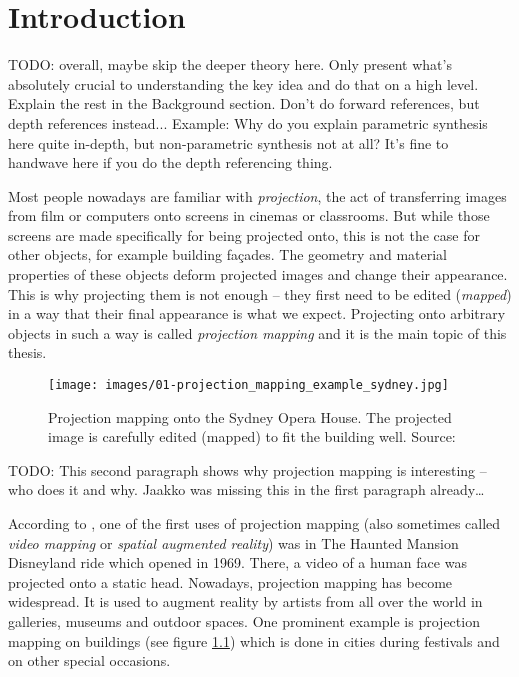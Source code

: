 \chapter{Introduction}
\label{chapter:intro}

{\color{red} TODO: overall, maybe skip the deeper theory here. Only present what's absolutely crucial to understanding the key idea and do that on a high level. Explain the rest in the Background section. Don't do forward references, but depth references instead... Example: Why do you explain parametric synthesis here quite in-depth, but non-parametric synthesis not at all? It's fine to handwave here if you do the depth referencing thing.}

Most people nowadays are familiar with \textit{projection}, the act of transferring images from film or computers onto screens in cinemas or classrooms. But while those screens are made specifically for being projected onto, this is not the case for other objects, for example building façades. The geometry and material properties of these objects deform projected images and change their appearance. This is why projecting them is not enough -- they first need to be edited (\textit{mapped}) in a way that their final appearance is what we expect. Projecting onto arbitrary objects in such a way is called \textit{projection mapping} and it is the main topic of this thesis.

\begin{figure}[ht]
    \begin{center}
        \texttt{[image: images/01-projection\_mapping\_example\_sydney.jpg]}
        \caption{Projection mapping onto the Sydney Opera House. The projected image is carefully edited (mapped) to fit the building well. Source: \citet{ImageProjectionMappingExampleSydney}}
        \label{fig:intro_example_sydney}
    \end{center}
\end{figure}

{\color{red} TODO: This second paragraph shows why projection mapping is interesting -- who does it and why. Jaakko was missing this in the first paragraph already\dots}

According to \citet*{WikiHauntedMansion}, one of the first uses of projection mapping (also sometimes called \textit{video mapping} or \textit{spatial augmented reality}) was in The Haunted Mansion Disneyland ride which opened in 1969. There, a video of a human face was projected onto a static head. Nowadays, projection mapping has become widespread. It is used to augment reality by artists from all over the world in galleries, museums and outdoor spaces. One prominent example is projection mapping on buildings (see figure \ref{fig:intro_example_sydney}) which is done in cities during festivals and on other special occasions.

